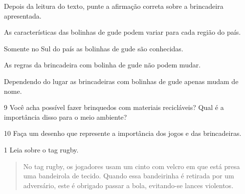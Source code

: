 \noindent{}Depois da leitura do texto, punte a afirmação correta sobre a
brincadeira apresentada.

\begin{escolha}
\item
  As características das bolinhas de gude podem variar para cada região
  do país.
\item
  Somente no Sul do país as bolinhas de gude são conhecidas.
\item
  As regras da brincadeira com bolinha de gude não podem mudar.
\item
  Dependendo do lugar as brincadeiras com bolinhas de gude apenas mudam
  de nome.
\end{escolha}


\num{9} Você acha possível fazer brinquedos com materiais recicláveis? Qual é a importância disso para o meio ambiente?


\num{10} Faça um desenho que represente a importância dos jogos e das brincadeiras.

\begin{mdframed}[linewidth=2pt,linecolor=salmao]
\vspace{10cm}
\end{mdframed}


\num{1} Leia sobre o tag rugby.
\begin{quote}
  No tag rugby, os jogadores usam um cinto com
  velcro em que está presa uma bandeirola de tecido. Quando essa bandeirinha é retirada
  por um adversário, este é obrigado passar a bola, evitando-se lances violentos.

\end{quote}

